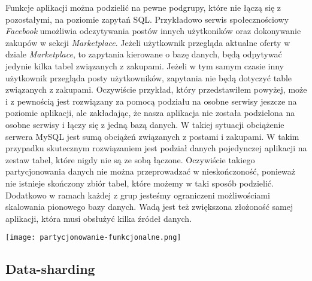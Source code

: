 Funkcje aplikacji można podzielić na pewne podgrupy, które nie łączą się z pozostałymi, na poziomie zapytań SQL. Przykładowo serwis społecznościowy \textit{Facebook} umożliwia odczytywania postów innych użytkoników oraz dokonywanie zakupów w sekcji \textit{Marketplace}. Jeżeli użytkownik przegląda aktualne oferty w dziale \textit{Marketplace}, to zapytania kierowane o bazę danych, będą odpytywać jedynie kilka tabel związanych z zakupami. Jeżeli w tym samym czasie inny użytkownik przegląda posty użytkowników, zapytania nie będą dotyczyć table związanych z zakupami. Oczywiście przykład, który przedstawiłem powyżej, może i z pewnością jest rozwiązany za pomocą podziału na osobne serwisy jeszcze na poziomie aplikacji, ale zakładając, że nasza aplikacja nie została podzielona na osobne serwisy i łączy się z jedną bazą danych. W takiej sytuacji obciążenie serwera MySQL jest sumą obciążeń związanych z postami i zakupami. W takim przypadku skutecznym rozwiązaniem jest podział danych pojedynczej aplikacji na zestaw tabel, które nigdy nie są ze sobą łączone. Oczywiście takiego partycjonowania danych nie można przeprowadzać w nieskończoność, ponieważ nie istnieje skończony zbiór tabel, które możemy w taki sposób podzielić. Dodatkowo w ramach każdej z grup jesteśmy ograniczeni możliwościami skalowania pionowego bazy danych. Wadą jest też zwiększona złożoność samej aplikacji, która musi obsłużyć kilka źródeł danych. 

\begin{center}
	\texttt{[image: partycjonowanie-funkcjonalne.png]} 
\end{center}


\subsection{Data-sharding}

